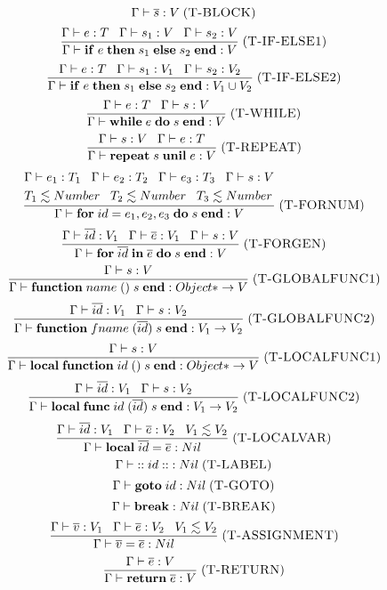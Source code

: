 \documentclass[12pt]{article}
\newcommand{\mylabel}[1]{\; (\textsc{#1})}
\newcommand{\env}{\Gamma}
\begin{document}
\[
\env \vdash \overline{s} : V
\mylabel{T-BLOCK}
\]
\[
\frac{\env \vdash e:T \;\;\; \env \vdash s_{1}:V \;\;\; \env \vdash s_{2}:V}
     {\env \vdash \mathbf{if} \; e \; \mathbf{then} \; s_{1} \;
      \mathbf{else} \; s_{2} \; \mathbf{end} : V}
\mylabel{T-IF-ELSE1}
\]
\[
\frac{\env \vdash e:T \;\;\;
      \env \vdash s_{1}:V_{1} \;\;\; \env \vdash s_{2}:V_{2}}
     {\env \vdash \mathbf{if} \; e \; \mathbf{then} \; s_{1} \;
      \mathbf{else} \; s_{2} \; \mathbf{end} : V_{1} \cup V_{2}}
\mylabel{T-IF-ELSE2}
\]
\[
\frac{\env \vdash e:T \;\;\; \env \vdash s:V}
     {\env \vdash \mathbf{while} \; e \; \mathbf{do} \; s \; \mathbf{end}: V}
\mylabel{T-WHILE}
\]
\[
\frac{\env \vdash s:V \;\;\; \env \vdash e:T}
     {\env \vdash \mathbf{repeat} \; s \; \mathbf{unil} \; e : V}
\mylabel{T-REPEAT}
\]
\[
\frac{\begin{aligned}
      & \env \vdash e_{1}:T_{1} \;\;\; \env \vdash e_{2}:T_{2} \;\;\;
      \env \vdash e_{3}:T_{3} \;\;\; \env \vdash s:V\\
      & T_{1} \lesssim Number \;\;\;
      T_{2} \lesssim Number \;\;\;
      T_{3} \lesssim Number
      \end{aligned}}
     {\env \vdash \mathbf{for} \; id = e_{1},e_{2},e_{3} \;
      \mathbf{do} \; s \; \mathbf{end} : V}
\mylabel{T-FORNUM}
\]
\[
\frac{\env \vdash \overline{id}:V_{1} \;\;\; \env \vdash \overline{e}:V_{1}
      \;\;\; \env \vdash s:V}
     {\env \vdash \textbf{for} \; \overline{id} \; \mathbf{in} \; \overline{e}
      \; \mathbf{do} \; s \; \mathbf{end} : V}
\mylabel{T-FORGEN}
\]
\[
\frac{\env \vdash s:V}
     {\env \vdash \mathbf{function} \; name \; ()
      \; s \; \mathbf{end} : {Object*} \rightarrow V}
\mylabel{T-GLOBALFUNC1}
\]
\[
\frac{\env \vdash \overline{id}:V_{1} \;\;\; \env \vdash s:V_{2}}
     {\env \vdash \mathbf{function} \; fname \; (\overline{id})
      \; s \; \mathbf{end} : V_{1} \rightarrow V_{2}}
\mylabel{T-GLOBALFUNC2}
\]
\[
\frac{\env \vdash s:V}
     {\env \vdash \mathbf{local} \; \mathbf{function} \; id \; ()
      \; s \; \mathbf{end} : {Object*} \rightarrow V}
\mylabel{T-LOCALFUNC1}
\]
\[
\frac{\env \vdash \overline{id}:V_{1} \;\;\; \env \vdash s:V_{2}}
     {\env \vdash \mathbf{local} \; \mathbf{func} \; id \; (\overline{id})
      \; s \; \mathbf{end} : V_{1} \rightarrow V_{2}}
\mylabel{T-LOCALFUNC2}
\]
\[
\frac{\env \vdash \overline{id}:V_{1} \;\;\; \env \vdash \overline{e}:V_2
      \;\;\; V_{1} \lesssim V_{2}}
     {\env \vdash \mathbf{local} \; \overline{id} = \overline{e} : Nil}
\mylabel{T-LOCALVAR}
\]
\[
\env \vdash \mathbf{::} \; id \; \mathbf{::} : Nil
\mylabel{T-LABEL}
\]
\[
\env \vdash \mathbf{goto} \; id : Nil
\mylabel{T-GOTO}
\]
\[
\env \vdash \mathbf{break} : Nil
\mylabel{T-BREAK}
\]
\[
\frac{\env \vdash \overline{v}:V_{1} \;\;\; \env \vdash \overline{e}:V_2
      \;\;\; V_{1} \lesssim V_{2}}
     {\env \vdash \overline{v} = \overline{e} : Nil}
\mylabel{T-ASSIGNMENT}
\]
\[
\frac{\env \vdash \overline{e}:V}
     {\env \vdash \mathbf{return} \; \overline{e} : V}
\mylabel{T-RETURN}
\]
\end{document}
